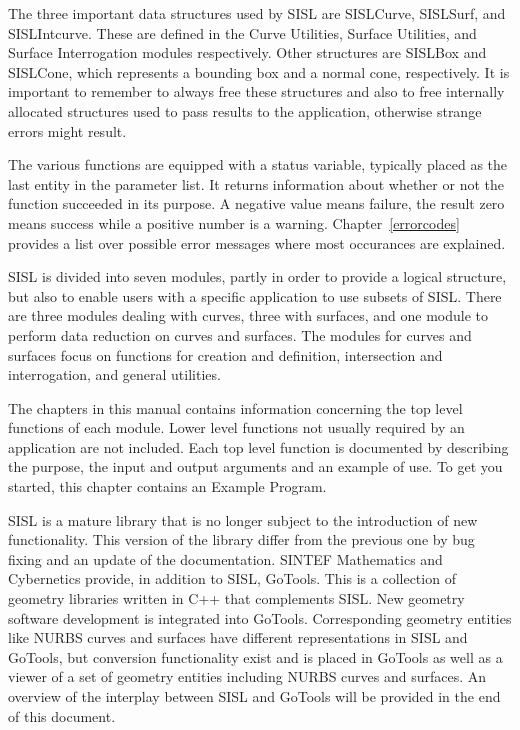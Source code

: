 The three important data structures used by SISL are SISLCurve,
SISLSurf, and SISLIntcurve. These are defined in the Curve Utilities,
Surface Utilities, and Surface Interrogation modules respectively. Other
structures are SISLBox and SISLCone, which represents a bounding box and
a normal cone, respectively. It is
important to remember to always free these structures and also to free
internally allocated structures used to pass results to the application,
otherwise strange errors might result.

The various functions are equipped with a status variable, typically
placed as the last entity in the parameter list. It returns information
about whether or not the function succeeded in its purpose. A negative
value means failure, the result zero means success while a positive
number is a warning. Chapter~\ref{errorcodes} provides a list over
possible error messages where most occurances are explained. 

\medskip
SISL is divided into seven modules, partly in order to provide a logical
structure, but also to enable users with a specific application to use
subsets of SISL. There are three modules dealing with curves, three with
surfaces, and one module to perform data reduction on curves and
surfaces. The modules for
curves and surfaces focus on functions for creation and definition,
intersection and interrogation, and general utilities.

The chapters in this manual contains information concerning the top
level functions of each module. Lower level functions not usually
required by an application are not included. Each top level function is
documented by describing the purpose, the input and output arguments and
an example of use. To get you started, this chapter contains an Example
Program.

\medskip
SISL is a mature library that is no longer subject to the introduction of new functionality.
This version of the library differ from the previous one by bug fixing and
an update of the documentation. SINTEF Mathematics and Cybernetics provide, in
addition to SISL, GoTools. This is a collection of geometry libraries written
in C++ that complements SISL. New geometry software development is integrated
into GoTools. Corresponding geometry entities like NURBS curves and surfaces
have different representations in SISL and GoTools, but conversion
functionality exist and is placed in GoTools as well as a viewer of a set of geometry
entities including NURBS curves and surfaces. An overview of the interplay
between SISL and GoTools will be provided in the end of this document.


